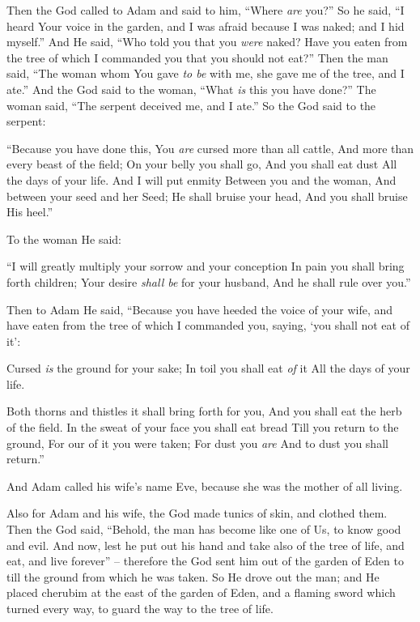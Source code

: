 \bverse Then the \lord God called to Adam and said to him, ``Where \textit{are} you?''
\bverse So he said, ``I heard Your voice in the garden, and I was afraid because I was naked; and I hid myself.''
\bverse And He said, ``Who told you that you \textit{were} naked? Have you eaten from the tree of which I commanded you that you should not eat?''
\bverse Then the man said, ``The woman whom You gave \textit{to be} with me, she gave me of the tree, and I ate.''
\bverse And the \lord God said to the woman, ``What \textit{is} this you have done?'' The woman said, ``The serpent deceived me, and I ate.''
\bverse So the \lord God said to the serpent: 
\begin{bquotation}
``Because you have done this, You \textit{are} cursed more than all cattle, And more than every beast of the field; On your belly you shall go, And you shall eat dust All the days of your life.
\bverse And I will put enmity Between you and the woman, And between your seed and her Seed; He shall bruise your head, And you shall bruise His heel.''
\end{bquotation}
\bverse To the woman He said: 
\begin{bquotation}
``I will greatly multiply your sorrow and your conception In pain you shall bring forth children; Your desire \textit{shall be} for your husband, And he shall rule over you.''
\end{bquotation}
\bverse Then to Adam He said, ``Because you have heeded the voice of your wife, and have eaten from the tree of which I commanded you, saying, `you shall not eat of it':
\begin{bquotation}
Cursed \textit{is} the ground for your sake; In toil you shall eat \textit{of} it All the days of your life.

\bverse Both thorns and thistles it shall bring forth for you, And you shall eat the herb of the field.
\bverse In the sweat of your face you shall eat bread Till you return to the ground, For our of it you were taken; For dust you \textit{are} And to dust you shall return.''
\end{bquotation}
\bverse And Adam called his wife's name Eve, because she was the mother of all living.

\bverse Also for Adam and his wife, the \lord God made tunics of skin, and clothed them.
\bverse Then the \lord God said, ``Behold, the man has become like one of Us, to know good and evil. And now, lest he put out his hand and take also of the tree of life, and eat, and live forever'' --
\bverse therefore the \lord God sent him out of the garden of Eden to till the ground from which he was taken.
\bverse So He drove out the man; and He placed cherubim at the east of the garden of Eden, and a flaming sword which turned every way, to guard the way to the tree of life.



